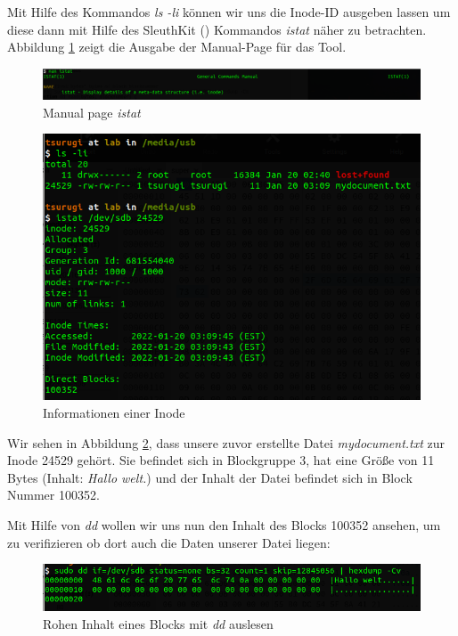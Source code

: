 Mit Hilfe des Kommandos \textit{ls -li} können wir uns die Inode-ID ausgeben lassen um diese dann mit Hilfe des SleuthKit (\cite{Sleuthkit.07.01.2022}) Kommandos \textit{istat} näher zu betrachten. Abbildung \ref{fig:istatman} zeigt die Ausgabe der Manual-Page für das Tool.

\begin{figure}[H]
	\centering
	\includegraphics[width=12cm,keepaspectratio=true]{pictures/istat-man.png}
	\caption{
		Manual page \textit{istat}
	}
	\label{fig:istatman}
\end{figure}


\begin{figure}[H]
	\centering
	\includegraphics[width=12cm,keepaspectratio=true]{pictures/inode-stats.png}
	\caption{
		Informationen einer Inode
	}
	\label{fig:inodestats}
\end{figure}

Wir sehen in Abbildung \ref{fig:inodestats}, dass unsere zuvor erstellte Datei \textit{mydocument.txt} zur Inode 24529 gehört. Sie befindet sich in Blockgruppe 3, hat eine Größe von 11 Bytes (Inhalt: \textit{Hallo welt.}) und der Inhalt der Datei befindet sich in Block Nummer 100352.

Mit Hilfe von \textit{dd} wollen wir uns nun den Inhalt des Blocks 100352 ansehen, um zu verifizieren ob dort auch die Daten unserer Datei liegen:

\begin{figure}[H]
	\centering
	\includegraphics[width=12cm,keepaspectratio=true]{pictures/getfilecontent.png}
	\caption{
		Rohen Inhalt eines Blocks mit \textit{dd} auslesen
	}
	\label{fig:getfilecontent}
\end{figure}

